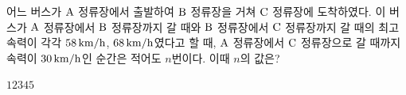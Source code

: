 어느 버스가 $\mathrm{A}$ 정류장에서 출발하여 $\mathrm{B}$ 정류장을 거쳐 $\mathrm{C}$ 정류장에 도착하였다. 이 버스가 $\mathrm{A}$ 정류장에서 $\mathrm{B}$ 정류장까지 갈 때와 $\mathrm{B}$ 정류장에서 $\mathrm{C}$ 정류장까지 갈 때의 최고 속력이 각각 $58\mkern3mu \mathrm{km/h}$, $68\mkern3mu \mathrm{km/h}$였다고 할 때, $\mathrm{A}$ 정류장에서 $\mathrm{C}$ 정류장으로 갈 때까지 속력이 $30\mkern3mu \mathrm{km/h}$인 순간은 적어도 $n$번이다. 이때 $n$의 값은? 
\begin{choices32}{$1$}{$2$}{$3$}{$4$}{$5$}\end{choices32}
